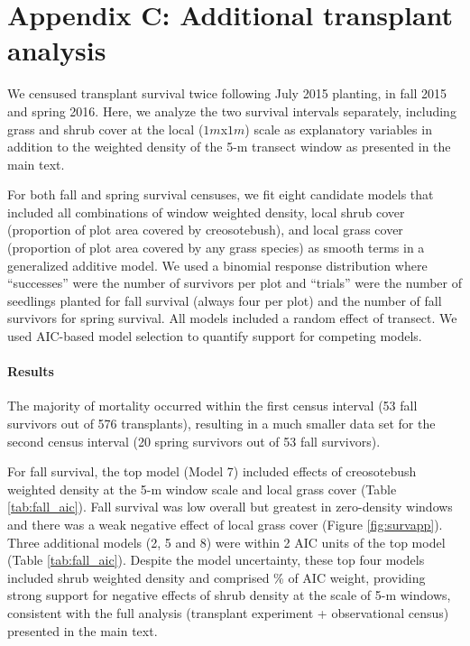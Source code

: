 \documentclass[11pt]{article}\usepackage[]{graphicx}\usepackage[]{color}
\begin{document}
\newpage
\section*{Appendix C: Additional transplant analysis}
\renewcommand{\thefigure}{C\arabic{figure}}\setcounter{figure}{0}
\renewcommand{\thetable}{C\arabic{table}}\setcounter{table}{0}
\renewcommand{\theequation}{C\arabic{equation}}\setcounter{equation}{0}

We censused transplant survival twice following July 2015 planting, in fall 2015 and spring 2016. 
Here, we analyze the two survival intervals separately, including grass and shrub cover at the local ($1m$x$1m$) scale as explanatory variables in addition to the weighted density of the 5-m transect window as presented in the main text. 

For both fall and spring survival censuses, we fit eight candidate models that included all combinations of window weighted density, local shrub cover (proportion of plot area covered by creosotebush), and local grass cover (proportion of plot area covered by any grass species) as smooth terms in a generalized additive model.
We used a binomial response distribution where ``successes'' were the number of survivors per plot and ``trials'' were the number of seedlings planted for fall survival (always four per plot) and the number of fall survivors for spring survival. 
All models included a random effect of transect. 
We used AIC-based model selection to quantify support for competing models. 

\paragraph{Results}The majority of mortality occurred within the first census interval (53 fall survivors out of 576 transplants), resulting in a much smaller data set for the second census interval (20 spring survivors out of 53 fall survivors).

For fall survival, the top model (Model 7) included effects of creosotebush weighted density at the 5-m window scale and local grass cover (Table \ref{tab:fall_aic}). 
Fall survival was low overall but greatest in zero-density windows and there was a weak negative effect of local grass cover (Figure \ref{fig:survapp}).
Three additional models (2, 5 and 8) were within 2 AIC units of the top model (Table \ref{tab:fall_aic}). 
Despite the model uncertainty, these top four models included shrub weighted density and comprised \% of AIC weight, providing strong support for negative effects of shrub density at the scale of 5-m windows, consistent with the full analysis (transplant experiment + observational census) presented in the main text.
\end{document}
